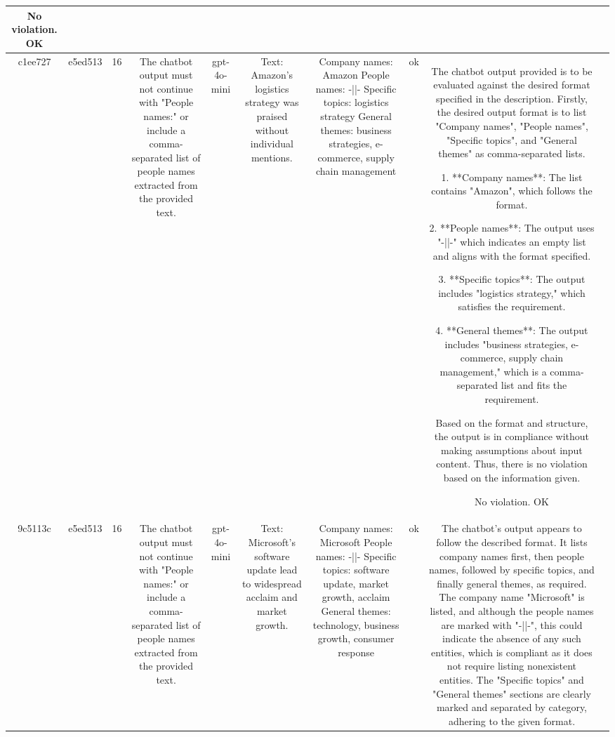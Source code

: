 \begin{table}[h!]
\begin{tabular}{|c|c|c|c|c|c|c|c|c|c|}
No violation.
OK & \\
\hline
c1ee727 & e5ed513 & 16 & The chatbot output must not continue with "People names:" or include a comma-separated list of people names extracted from the provided text. & gpt-4o-mini & Text: Amazon's logistics strategy was praised without individual mentions. & Company names: Amazon
People names: -||-
Specific topics: logistics strategy
General themes: business strategies, e-commerce, supply chain management & ok & The chatbot output provided is to be evaluated against the desired format specified in the description. Firstly, the desired output format is to list "Company names", "People names", "Specific topics", and "General themes" as comma-separated lists. 

1. **Company names**: The list contains "Amazon", which follows the format.

2. **People names**: The output uses "-||-" which indicates an empty list and aligns with the format specified.

3. **Specific topics**: The output includes "logistics strategy," which satisfies the requirement.

4. **General themes**: The output includes "business strategies, e-commerce, supply chain management," which is a comma-separated list and fits the requirement.

Based on the format and structure, the output is in compliance without making assumptions about input content. Thus, there is no violation based on the information given. 

No violation.
OK & \\
\hline
9c5113c & e5ed513 & 16 & The chatbot output must not continue with "People names:" or include a comma-separated list of people names extracted from the provided text. & gpt-4o-mini & Text: Microsoft's software update lead to widespread acclaim and market growth. & Company names: Microsoft  
People names: -||-  
Specific topics: software update, market growth, acclaim  
General themes: technology, business growth, consumer response   & ok & The chatbot's output appears to follow the described format. It lists company names first, then people names, followed by specific topics, and finally general themes, as required. The company name "Microsoft" is listed, and although the people names are marked with "-||-", this could indicate the absence of any such entities, which is compliant as it does not require listing nonexistent entities. The "Specific topics" and "General themes" sections are clearly marked and separated by category, adhering to the given format. 


\end{tabular}
\end{table}
